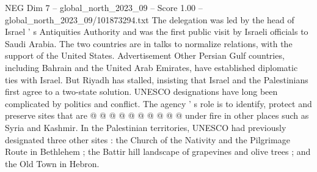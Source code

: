 \begin{textsample}{NEG Dim 7 – global\_north\_2023\_09 – Score 1.00 – global\_north\_2023\_09/101873294.txt}
The delegation was led by the head of Israel ' s Antiquities Authority and was the first public visit by Israeli officials to Saudi Arabia.
The two countries are in talks to normalize relations, with the support of the United States.
Advertisement Other Persian Gulf countries, including Bahrain and the United Arab Emirates, have established diplomatic ties with Israel.
But Riyadh has stalled, insisting that Israel and the Palestinians first agree to a two-state solution.
UNESCO designations have long been complicated by politics and conflict.
The agency ' s role is to identify, protect and preserve sites that are @ @ @ @ @ @ @ @ @ @ under fire in other places such as Syria and Kashmir.
In the Palestinian territories, UNESCO had previously designated three other sites : the Church of the Nativity and the Pilgrimage Route in Bethlehem ; the Battir hill landscape of grapevines and olive trees ; and the Old Town in Hebron.

\end{textsample}
